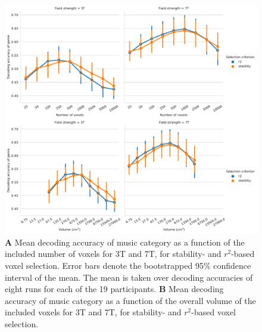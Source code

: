 \begin{figure}
  \centering
  \includegraphics[width=\linewidth]{pics/decoding_genre_selection.pdf}

  \caption{\textbf{A} Mean decoding accuracy of music category as a function of
  the included number of voxels for 3T and 7T, for stability- and
  $r^2$-based voxel selection. Error bars denote the bootstrapped 95\%
  confidence interval of the mean. The mean is taken over decoding
  accuracies of eight runs for each of the 19 participants. \textbf{B} Mean
decoding accuracy of music category as a function of the overall volume of the
included voxels for 3T and 7T, for stability- and $r^2$-based voxel
selection.
}

 \label{fig:decoding_accuracy_selection}
\end{figure}





